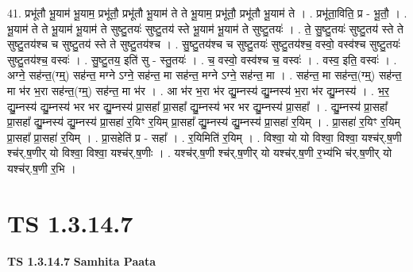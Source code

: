 \documentclass[17pt]{extarticle}
\begin{document}
41. प्रभू॑तौ भू॒याम॑ भू॒याम॒ प्रभू॑तौ॒ प्रभू॑तौ भू॒याम॑ ते ते भू॒याम॒ प्रभू॑तौ॒ प्रभू॑तौ भू॒याम॑ ते । . प्रभू॑ता॒विति॒ प्र - भू॒तौ॒ । . भू॒याम॑ ते ते भू॒याम॑ भू॒याम॑ ते सुष्टु॒तयः॑ सुष्टु॒तय॑ स्ते भू॒याम॑ भू॒याम॑ ते सुष्टु॒तयः॑ । . ते॒ सु॒ष्टु॒तयः॑ सुष्टु॒तय॑ स्ते ते सुष्टु॒तय॑श्च च सुष्टु॒तय॑ स्ते ते सुष्टु॒तय॑श्च । . सु॒ष्टु॒तय॑श्च च सुष्टु॒तयः॑ सुष्टु॒तय॑श्च॒ वस्वो॒ वस्व॑श्च सुष्टु॒तयः॑ सुष्टु॒तय॑श्च॒ वस्वः॑ । . सु॒ष्टु॒तय॒ इति॑ सु - स्तु॒तयः॑ । . च॒ वस्वो॒ वस्व॑श्च च॒ वस्वः॑ । . वस्व॒ इति॒ वस्वः॑ । . अग्ने॒ सह॑न्त॒(ग्म्॒) सह॑न्त॒ मग्ने ऽग्ने॒ सह॑न्त॒ मा सह॑न्त॒ मग्ने ऽग्ने॒ सह॑न्त॒ मा । . सह॑न्त॒ मा सह॑न्त॒(ग्म्॒) सह॑न्त॒ मा भ॑र भ॒रा सह॑न्त॒(ग्म्॒) सह॑न्त॒ मा भ॑र । . आ भ॑र भ॒रा भ॑र द्यु॒म्नस्य॑ द्यु॒म्नस्य॑ भ॒रा भ॑र द्यु॒म्नस्य॑ । . भ॒र॒ द्यु॒म्नस्य॑ द्यु॒म्नस्य॑ भर भर द्यु॒म्नस्य॑ प्रा॒सहा᳚ प्रा॒सहा᳚ द्यु॒म्नस्य॑ भर भर द्यु॒म्नस्य॑ प्रा॒सहा᳚ । . द्यु॒म्नस्य॑ प्रा॒सहा᳚ प्रा॒सहा᳚ द्यु॒म्नस्य॑ द्यु॒म्नस्य॑ प्रा॒सहा॑ र॒यिꣳ र॒यिम् प्रा॒सहा᳚ द्यु॒म्नस्य॑ द्यु॒म्नस्य॑ प्रा॒सहा॑ र॒यिम् । . प्रा॒सहा॑ र॒यिꣳ र॒यिम् प्रा॒सहा᳚ प्रा॒सहा॑ र॒यिम् । . प्रा॒सहेति॑ प्र - सहा᳚ । . र॒यिमिति॑ र॒यिम् । . विश्वा॒ यो यो विश्वा॒ विश्वा॒ यश्च॑र्.ष॒णी श्च॑र्.ष॒णीर् यो विश्वा॒ विश्वा॒ यश्च॑र्.ष॒णीः । . यश्च॑र्.ष॒णी श्च॑र्.ष॒णीर् यो यश्च॑र्.ष॒णी र॒भ्य॑भि च॑र्.ष॒णीर् यो यश्च॑र्.ष॒णी र॒भि । \newline
\pagebreak
{}
\section*{ TS 1.3.14.7 }

\textbf{TS 1.3.14.7 } \newline
\textbf{Samhita Paata} \newline
\end{document}

